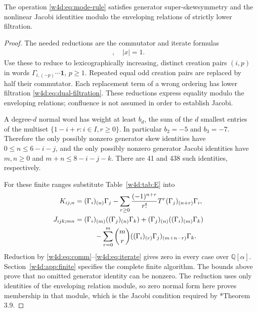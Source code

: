 \begin{lemma}\label{w4d:lem:jacobi}
The operation \eqref{w4d:eq:mode-rule} satisfies generator super-skewsymmetry and the nonlinear Jacobi identities modulo the enveloping relations of strictly lower filtration.
\end{lemma}
\begin{proof}
The needed reductions are the commutator and iterate formulas
\begin{align}
 [x_{(m)},y_{(n)}\}&=\sum_{r\geq0}\binom mr(x_{(r)}y)_{(m+n-r)},\label{w4d:eq:comm}\\
 (x_{(-p)}v)_{(n)}b
 &=\sum_{r\geq0}\binom{p+r-1}{r}\left[
 x_{(-p-r)}v_{(n+r)}b
 -(-1)^{p+|v|}v_{(n-p-r)}x_{(r)}b\right],\quad |x|=1.\label{w4d:eq:iterate}
\end{align}
Use these to reduce to lexicographically increasing, distinct creation pairs $(i,p)$ in words $\Gamma_{i,(-p)}\cdots\mathbf1$, $p\geq1$. Repeated equal odd creation pairs are replaced by half their commutator. Each replacement term of a wrong ordering has lower filtration \eqref{w4d:eq:dual-filtration}. These reductions express equality modulo the enveloping relations; confluence is not assumed in order to establish Jacobi.

A degree-$d$ normal word has weight at least $b_d$, the sum of the $d$ smallest entries of the multiset
$\{1-i+r:i\in I,r\geq0\}$. In particular $b_2=-5$ and $b_3=-7$. Therefore the only possibly nonzero generator skew identities have $0\leq n\leq6-i-j$, and the only possibly nonzero generator Jacobi identities have $m,n\geq0$ and $m+n\leq8-i-j-k$. There are 41 and 438 such identities, respectively.

For these finite ranges substitute Table~\ref{w4d:tab:E} into
\begin{align*}
 K_{ij,n}&=(\Gamma_i)_{(n)}\Gamma_j-
  \sum_{r\geq0}\frac{(-1)^{n+r}}{r!}T^r(\Gamma_j)_{(n+r)}\Gamma_i,\\
 J_{ijk;mn}&=(\Gamma_i)_{(m)}((\Gamma_j)_{(n)}\Gamma_k)
 +(\Gamma_j)_{(n)}((\Gamma_i)_{(m)}\Gamma_k)\\
 &\hspace{10mm}-\sum_{r=0}^{m}\binom mr
 ((\Gamma_i)_{(r)}\Gamma_j)_{(m+n-r)}\Gamma_k.
\end{align*}
Reduction by \eqref{w4d:eq:comm}--\eqref{w4d:eq:iterate} gives zero in every case over $\mathbb Q[\alpha]$. Section~\ref{w4d:app:finite} specifies the complete finite algorithm. The bounds above prove that no omitted generator identity can be nonzero. The reduction uses only identities of the enveloping relation module, so zero normal form here proves membership in that module, which is the Jacobi condition required by \cite{wdr:DSK}*{Theorem 3.9}.


\end{proof}
